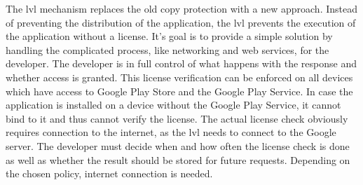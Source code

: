 \newline
The \gls{lvl} mechanism replaces the old copy protection with a new approach.
Instead of preventing the distribution of the application, the \gls{lvl} prevents the execution of the application without a license.
\newline
It's goal is to provide a simple solution by handling the complicated process, like networking and web services, for the developer.
The developer is in full control of what happens with the response and whether access is granted.
This license verification can be enforced on all devices which have access to Google Play Store and the Google Play Service.
In case the application is installed on a device without the Google Play Service, it cannot bind to it and thus cannot verify the license.
The actual license check obviously requires connection to the internet, as the \gls{lvl} needs to connect to the Google server.
The developer must decide when and how often the license check is done as well as whether the result should be stored for future requests.
Depending on the chosen policy, internet connection is needed. \cite{developersLicensingOverview} \cite{developersLicensingSetup} \cite{developersLicensingAdding} \cite{digipomLvl}
